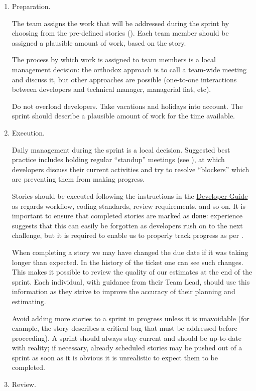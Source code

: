 \begin{enumerate}
\item Preparation.

  The team assigns the work that will be addressed during the sprint by choosing from the pre-defined stories ().
  Each team member should be assigned a plausible amount of work, based on the \gls{story}.

  The process by which work is assigned to team members is a local
  management decision: the orthodox approach is to call a team-wide
  meeting and discuss it, but other approaches are possible (one-to-one
  interactions between developers and technical manager, managerial
  fiat, etc).

  Do not overload developers. Take vacations and holidays into account.
  The sprint should describe a plausible amount of work for the time
  available.
\item Execution.

  Daily management during the sprint is a local decision. Suggested best
  practice includes holding regular ``standup'' meetings (see ), at which
  developers discuss their current activities and try to resolve
  ``blockers'' which are preventing them from making progress.

  Stories should be executed following the instructions in the
  \href{http://developer.lsst.io/}{Developer Guide} as regards workflow,
  coding standards, review requirements, and so on. It is important to
  ensure that completed stories are marked as \texttt{done}:
  experience suggests that this can easily be forgotten as developers
  rush on to the next challenge, but it is required to enable us to
  properly track progress as per .

  When completing a \gls{story} we may have changed the due date if it was taking longer than expected. 
  In the history of the ticket one can see such changes.
  This makes it possible to review the quality of our estimates at the end of the sprint.
  Each individual, with guidance from their Team Lead, should use this information as they strive to improve the accuracy of their planning and estimating.

  Avoid adding more stories to a sprint in progress unless it is
  unavoidable (for example, the \gls{story} describes a critical bug that must
  be addressed before proceeding). A sprint should always stay current
  and should be up-to-date with reality; if necessary, already scheduled
  stories may be pushed out of a sprint as soon as it is obvious it is
  unrealistic to expect them to be completed.
\item \gls{Review}.


\end{enumerate}
